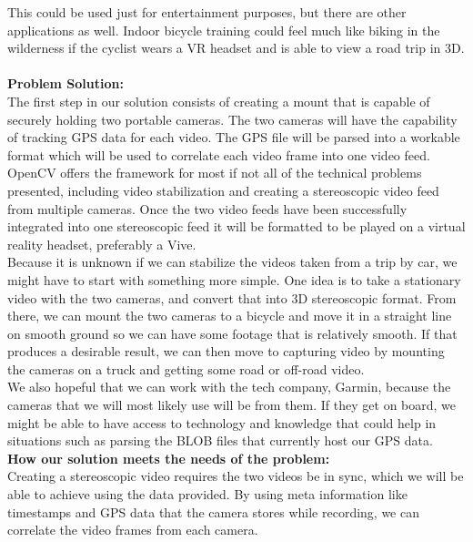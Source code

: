 \documentclass[10pt,draftclsnofoot,onecolumn]{IEEEtran}
\begin{document}
This could be used just for entertainment purposes, but there are other applications as well. Indoor bicycle training could feel much like biking in the wilderness if the cyclist wears a VR headset and is able to view a road trip in 3D. \\

\\

{\Medium\textbf{Problem Solution:}}\\


The first step in our solution consists of creating a mount that is capable of securely holding two portable cameras. The two cameras will have the capability of tracking GPS data for each video. The GPS file will be parsed into a workable format which will be used to correlate each video frame into one video feed. OpenCV offers the framework for most if not all of the technical problems presented, including video stabilization and creating a stereoscopic video feed from multiple cameras. Once the two video feeds have been successfully integrated into one stereoscopic feed it will be formatted to be played on a virtual reality headset, preferably a Vive.
 \\


Because it is unknown if we can stabilize the videos taken from a trip by car, we might have to start with something more simple. One idea is to take a stationary video with the two cameras, and convert that into 3D stereoscopic format. From there, we can mount the two cameras to a bicycle and move it in a straight line on smooth ground so we can have some footage that is relatively smooth. If that produces a desirable result, we can then move to capturing video by mounting the cameras on a truck and getting some road or off-road video.\\
 


We also hopeful that we can work with the tech company, Garmin, because the cameras that we will most likely use will be from them. If they get on board, we might be able to have access to technology and knowledge that could help in situations such as parsing the BLOB files that currently host our GPS data.
 \\ 

{\Medium\textbf{How our solution meets the needs of the problem:}}\\

Creating a stereoscopic video requires the two videos be in sync, which we will be able to achieve using the data provided. By using meta information like timestamps and GPS data that the camera stores while recording, we can correlate the video frames from each camera. \\
\end{document}

